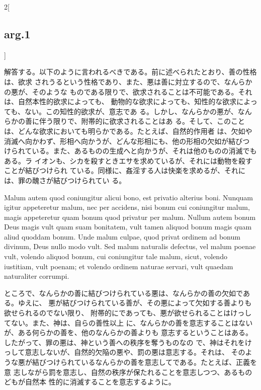 \documentclass[paper=a4paper,fontsize=10pt,jafontsize=9pt,titlepage]{jlreq}
\begin{document}
\begin{paracol}{2}[\subsection{arg.1}]
\switchcolumn

解答する。以下のように言われるべきである。前に述べられたとおり、善の性格は、欲求
されうるという性格であり、また、悪は善に対立するので、なんらかの悪が、そのような
ものである限りで、欲求されることは不可能である。それは、自然本性的欲求によっても、
動物的な欲求によっても、知性的な欲求によっても、ない。この知性的欲求が、意志であ
る。しかし、なんらかの悪が、なんらかの善に伴う限りで、附帯的に欲求されることはあ
る。そして、このことは、どんな欲求においても明らかである。たとえば、自然的作用者
は、欠如や消滅へ向かわず、形相へ向かうが、どんな形相にも、他の形相の欠如が結びつ
けられている。また、あるものの生成へと向かうが、それは他のものの消滅でもある。ラ
イオンも、シカを殺すときエサを求めているが、それには動物を殺すことが結びつけられ
ている。同様に、姦淫する人は快楽を求めるが、それには、罪の醜さが結びつけられてい
る。

\switchcolumn*


Malum autem quod coniungitur alicui bono, est privatio alterius boni. Nunquam
igitur appeteretur malum, nec per accidens, nisi bonum cui coniungitur malum,
magis appeteretur quam bonum quod privatur per malum. Nullum autem bonum Deus
magis vult quam suam bonitatem, vult tamen aliquod bonum magis quam aliud
quoddam bonum. Unde malum culpae, quod privat ordinem ad bonum divinum, Deus
nullo modo vult. Sed malum naturalis defectus, vel malum poenae vult, volendo
aliquod bonum, cui coniungitur tale malum, sicut, volendo iustitiam, vult
poenam; et volendo ordinem naturae servari, vult quaedam naturaliter corrumpi.

\switchcolumn

ところで、なんらかの善に結びつけられている悪は、なんらかの善の欠如である。ゆえに、
悪が結びつけられている善が、その悪によって欠如する善よりも欲せられるのでない限り、
附帯的にであっても、悪が欲せられることはけっしてない。また、神は、自らの善性以上
に、なんらかの善を意志することはないが、ある何らかの善を、他のなんらかの善よりも
意志するということはある。したがって、罪の悪は、神という善への秩序を奪うものなの
で、神はそれをけっして意志しないが、自然的欠陥の悪や、罰の悪は意志する。それは、
そのような悪が結びつけられているなんらかの善を意志してである。たとえば、正義を意
志しながら罰を意志し、自然の秩序が保たれることを意志しつつ、あるものどもが自然本
性的に消滅することを意志するように。

\switchcolumn*[\subsection{ad.1}]



\end{paracol}
\end{document}
